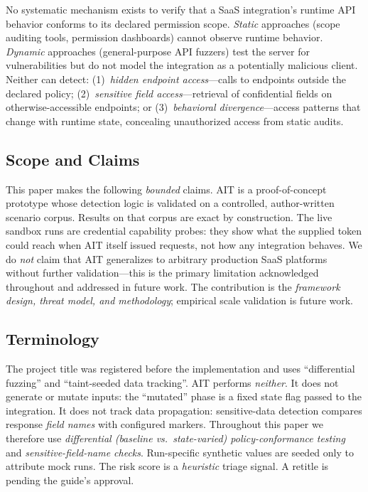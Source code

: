 \documentclass[conference]{IEEEtran}
\begin{document}
No systematic mechanism exists to verify that a SaaS integration's
runtime API behavior conforms to its declared permission scope.
\emph{Static} approaches (scope auditing tools, permission dashboards)
cannot observe runtime behavior. \emph{Dynamic} approaches
(general-purpose API fuzzers) test the server for vulnerabilities but
do not model the integration as a potentially malicious client.
Neither can detect: (1)~\emph{hidden endpoint access}---calls to
endpoints outside the declared policy; (2)~\emph{sensitive field
access}---retrieval of confidential fields on otherwise-accessible
endpoints; or (3)~\emph{behavioral divergence}---access patterns that
change with runtime state, concealing unauthorized access from static
audits.

\subsection{Scope and Claims}
\label{sec:scope}

This paper makes the following \emph{bounded} claims. AIT is a
proof-of-concept prototype whose detection logic is validated on a
controlled, author-written scenario corpus. Results on that corpus are
exact by construction. The live sandbox runs are credential capability
probes: they show what the supplied token could reach when AIT itself
issued requests, not how any integration behaves. We do \emph{not} claim that
AIT generalizes to arbitrary production SaaS platforms without further
validation---this is the primary limitation acknowledged throughout
and addressed in future work. The contribution is the \emph{framework
design, threat model, and methodology}; empirical scale validation is
future work.

\subsection{Terminology}
\label{sec:terms}

The project title was registered before the implementation and uses
``differential fuzzing'' and ``taint-seeded data tracking''. AIT performs
\emph{neither}. It does not generate or mutate inputs: the ``mutated''
phase is a fixed state flag passed to the integration. It does not track
data propagation: sensitive-data detection compares response \emph{field
names} with configured markers. Throughout this paper we therefore use
\emph{differential (baseline vs.\ state-varied) policy-conformance testing}
and \emph{sensitive-field-name checks}. Run-specific synthetic values are
seeded only to attribute mock runs. The risk score is a \emph{heuristic}
triage signal. A retitle is pending the guide's approval.
\end{document}
